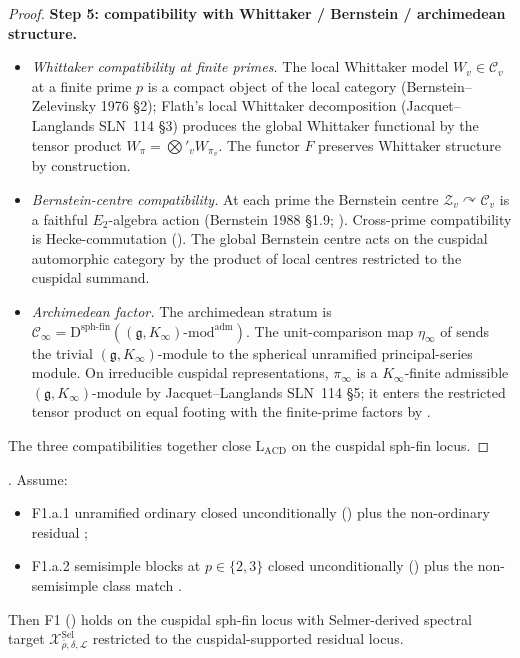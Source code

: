 \begin{proof}
\textbf{Step 5: compatibility with Whittaker / Bernstein / archimedean
structure.}
\begin{itemize}
\item \emph{Whittaker compatibility at finite primes.} The local
Whittaker model \(W_{v}\in\mathcal{C}_{v}\) at a finite prime \(p\) is a
compact object of the local category (Bernstein--Zelevinsky 1976
\S 2); Flath's local Whittaker decomposition (Jacquet--Langlands
SLN~114 \S 3) produces the global Whittaker functional by the
tensor product
\(W_{\pi}=\bigotimes'_{v}W_{\pi_{v}}\). The functor \(F\) preserves
Whittaker structure by construction.
\item \emph{Bernstein-centre compatibility.} At each prime the
Bernstein centre
\(\mathcal{Z}_{v}\curvearrowright\mathcal{C}_{v}\) is a faithful
\(E_{2}\)-algebra action (Bernstein 1988 \S 1.9;
). Cross-prime compatibility is
Hecke-commutation (). The global
Bernstein centre acts on the cuspidal automorphic category by the
product of local centres restricted to the cuspidal summand.
\item \emph{Archimedean factor.} The archimedean stratum is
\(\mathcal{C}_{\infty}=\mathrm{D}^{\mathrm{sph\text{-}fin}}((\mathfrak{g},K_{\infty})\text{-mod}^{\mathrm{adm}})\).
The unit-comparison map \(\eta_{\infty}\) of
 sends the trivial
\((\mathfrak{g},K_{\infty})\)-module to the spherical unramified
principal-series module. On irreducible cuspidal representations,
\(\pi_{\infty}\) is a \(K_{\infty}\)-finite admissible
\((\mathfrak{g},K_{\infty})\)-module by Jacquet--Langlands SLN~114 \S 5;
it enters the restricted tensor product on equal footing with the
finite-prime factors by
.
\end{itemize}
The three compatibilities together close \(\mathrm{L}_{\mathrm{ACD}}\)
on the cuspidal sph-fin locus.
\end{proof}

\begin{corollary}
\label{v4-arith:w5-e:cor:F1-cuspidal}
\ClaimStatusProvedHereConditional. Assume:
\begin{itemize}
\item F1.a.1 unramified ordinary closed unconditionally
() plus the non-ordinary
residual ;
\item F1.a.2 semisimple blocks at \(p\in\{2,3\}\) closed unconditionally
() plus the non-semisimple
class match .
\end{itemize}
Then F1 () holds on the cuspidal
sph-fin locus with Selmer-derived spectral target
\(\mathcal{X}^{\mathrm{Sel}}_{\bar\rho,\delta,\mathcal{L}}\)
restricted to the cuspidal-supported residual locus.
\end{corollary}

